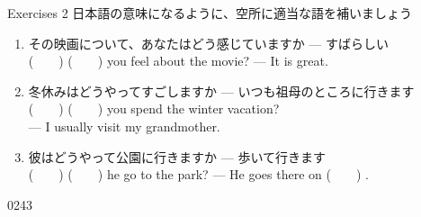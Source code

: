 \documentclass[aspectratio=169,xcolor={dvipsnames,table}]{beamer}
\begin{document}
\begin{frame}[plain]{Exercises 2}
 日本語の意味になるように、空所に適当な語を補いましょう
\begin{enumerate}
 \item {\small その映画について、あなたはどう感じていますか --- すばらしい}\\
       (~~~~)  (~~~~)  you feel about the movie? --- It is great.
 \item {\small 冬休みはどうやってすごしますか --- いつも祖母のところに行きます}\\
       (~~~~)  (~~~~)  you spend the winter vacation?\\
 --- I usually visit my grandmother.
 \item {\small 彼はどうやって公園に行きますか --- 歩いて行きます}\\
       (~~~~)  (~~~~)  he go to the park? --- He goes there on  (~~~~) .
\end{enumerate}

\mbox{}\hfill{}

\hfill{\tiny 0243}\,{\scriptsize {}}

\end{frame}
\end{document}
